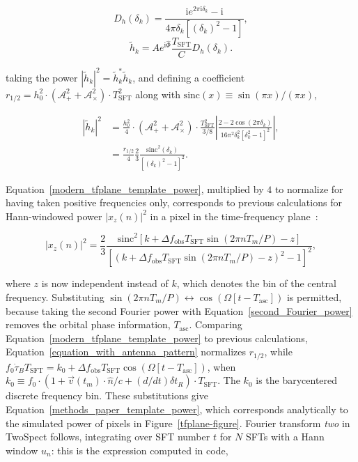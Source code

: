 \begin{equation}
D_h (\delta_k) = \frac{\mathrm{i} e^{2\pi \mathrm{i} \delta_k} - \mathrm{i}}{4\pi \delta_k \left[(\delta_k)^2 - 1 \right]},
\end{equation} 
\begin{equation}
\tilde{h}_k = A e^{\mathrm{i} \hat{\Phi}} \frac{T_\mathrm{SFT}}{C} D_h \left( \delta_k \right).
\end{equation}

\noindent taking the power $|\tilde{h}_k|^2 = \tilde{h}_k^*\tilde{h}_k$, and defining a coefficient $r_{1/2}= h_0^2 \cdot (\mathcal{A}_+^2 + \mathcal{A}_\times^2)\cdot T_\mathrm{SFT}^2$ along with $\mathrm{sinc}(x) \equiv \sin (\pi x)/ (\pi x)$,

\begin{eqnarray}
|\tilde{h}_k|^2 &= \frac{h_0^2}{4} \cdot (\mathcal{A}_+^2 + \mathcal{A}_\times^2)\cdot\frac{T_\mathrm{SFT}^2}{3/8} \left|\frac{2 - 2 \cos(2\pi \delta_k)}{16 \pi^2 \delta_k^2 [\delta_k^2 -1]^2} \right|,\nonumber \\
 &= \frac{r_{1/2}}{4} \frac{2}{3} \frac{\mathrm{sinc}^2\left(\delta_k\right)}{[\left(\delta_k \right)^2-1]^2}.
\label{modern_tfplane_template_power}
\end{eqnarray} 

Equation~\ref{modern_tfplane_template_power}, multiplied by $4$ to normalize for having taken positive frequencies only, corresponds to previous calculations for Hann-windowed power $|x_z(n)|^2$ in a pixel in the time-frequency plane~\cite{GoetzTwoSpectMethods2011}:

\begin{equation}
|x_z (n)|^2 = \frac{2}{3} \frac{\mathrm{sinc}^2\left[k + \Delta f_\mathrm{obs} T_\mathrm{SFT} \sin (2\pi n T_m/P) - z \right]}{\left[ (k + \Delta f_\mathrm{obs} T_\mathrm{SFT} \sin (2\pi n T_m / P) - z)^2 - 1 \right]^2},
\label{methods_paper_template_power}
\end{equation}

\noindent where $z$ is now independent instead of $k$, which denotes the bin of the central frequency. 
Substituting $\sin(2\pi nT_m/P) \leftrightarrow \cos(\Omega [t-T_\mathrm{asc}])$ is permitted, because taking the second Fourier power with Equation~\ref{second_Fourier_power} removes the orbital phase information, $T_\mathrm{asc}$.
Comparing Equation~\ref{modern_tfplane_template_power} to previous calculations, Equation~\ref{equation_with_antenna_pattern} normalizes $r_{1/2}$, while $f_0 \dot{\tau}_B T_\mathrm{SFT}= k_0 + \Delta f_\mathrm{obs} T_\mathrm{SFT} \cos(\Omega [t-T_\mathrm{asc}])$, when $k_0\equiv f_0 \cdot (1+\vec{v}(t_m)\cdot\hat{n}/c + (d/dt)\delta t_R)\cdot T_\mathrm{SFT}$.
The $k_0$ is the barycentered discrete frequency bin.
These substitutions give Equation~\ref{methods_paper_template_power}, which corresponds analytically to the simulated power of pixels in Figure~\ref{tfplane-figure}.
Fourier transform \textit{two} in TwoSpect follows, integrating over SFT number $t$ for $N$ SFTs with a Hann window $u_n$:
this is the expression computed in code,

